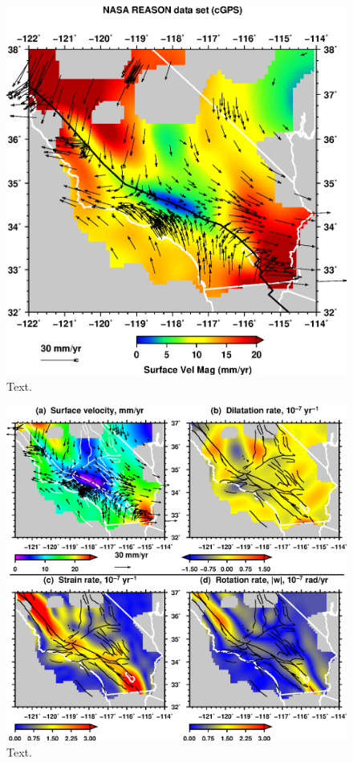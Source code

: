 \documentclass[11pt,titlepage,fleqn]{article}
\begin{document}
\begin{figure}
\includegraphics[width=16cm]{socal_d01_q03_q07_b1_2D_s1_u1_vfield.eps}
\caption[]
{{
Text.
\label{fig:2D_gmt1}
}}
\end{figure}

\begin{figure}
\includegraphics[width=16cm]{foursub_06_m1.eps}
\caption[]
{{
Text.
\label{fig:2D_gmt2}
}}
\end{figure}

\end{document}
